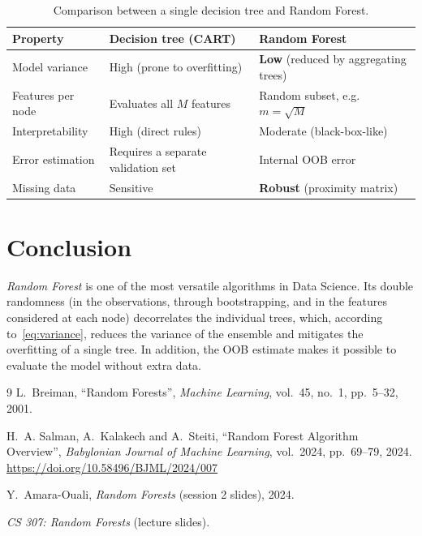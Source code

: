 \documentclass[12pt, a4paper]{article}
\begin{document}
\begin{table}[htbp]
\centering
\caption{Comparison between a single decision tree and Random Forest.}
\label{tab:rf_vs_cart}
\small
\begin{tabular}{>{\raggedright}p{3.6cm} >{\raggedright}p{5cm} >{\raggedright\arraybackslash}p{5cm}}
\toprule
\textbf{Property} & \textbf{Decision tree (CART)} & \textbf{Random Forest} \\
\midrule
Model variance & High (prone to overfitting) & \textbf{Low} (reduced by aggregating trees) \\
Features per node & Evaluates all $M$ features & Random subset, e.g.\ $m = \sqrt{M}$ \\
Interpretability & High (direct rules) & Moderate (black-box-like) \\
Error estimation & Requires a separate validation set & Internal OOB error \\
Missing data & Sensitive & \textbf{Robust} (proximity matrix) \\
\bottomrule
\end{tabular}
\end{table}

\section{Conclusion}
\textit{Random Forest} is one of the most versatile algorithms in Data Science. Its double randomness (in the observations, through bootstrapping, and in the features considered at each node) decorrelates the individual trees, which, according to~\eqref{eq:variance}, reduces the variance of the ensemble and mitigates the overfitting of a single tree. In addition, the OOB estimate makes it possible to evaluate the model without extra data.

\begin{thebibliography}{9}
L.~Breiman, ``Random Forests'', \textit{Machine Learning}, vol.~45, no.~1, pp.~5--32, 2001.

H.~A. Salman, A.~Kalakech and A.~Steiti, ``Random Forest Algorithm Overview'', \textit{Babylonian Journal of Machine Learning}, vol.~2024, pp.~69--79, 2024. \url{https://doi.org/10.58496/BJML/2024/007}

Y.~Amara-Ouali, \textit{Random Forests} (session 2 slides), 2024.

\textit{CS 307: Random Forests} (lecture slides).
\end{thebibliography}
\end{document}
